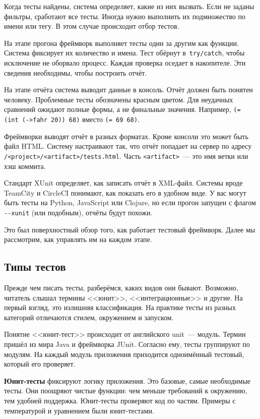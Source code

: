 Когда тесты найдены, система определяет, какие из них вызвать. Если не заданы
фильтры, сработают все тесты. Иногда нужно выполнить их подмножество по имени
или тегу. В этом случае происходит отбор тестов.

На этапе прогона фреймворк выполняет тесты один за другим как функции. Система
фиксирует их количество и имена. Тест обёрнут в~\verb|try/catch|, чтобы
исключение не оборвало процесс. Каждая проверка оседает в накопителе. Эти
сведения необходимы, чтобы построить отчёт.

На этапе отчёта система выводит данные в консоль. Отчёт должен быть понятен
человеку. Проблемные тесты обозначены красным цветом. Для неудачных сравнений
ожидают полные формы, а не финальные значения. Например,
\verb|(= (int (->fahr 20)) 68)| вместо \verb|(= 69 68)|.

Фреймворки выводят отчёт в разных форматах. Кроме консоли это может быть файл
HTML. Систему настраивают так, что отчёт попадает на сервер по адресу
\verb|/<project>/<artifact>/tests.html|. Часть \verb|<artifact>|~--- это имя
ветки или хэш коммита.

Стандарт XUnit определяет, как записать отчёт в XML-файл. Системы вроде TeamCity
и CircleCI понимают, как показать его в удобном виде. У вас могут быть тесты на
Python, JavaScript или Clojure, но если прогон запущен с флагом \verb|--xunit|
(или подобным), отчёты будут похожи.

Это был поверхностный обзор того, как работает тестовый фреймворк. Далее мы
рассмотрим, как управлять им на каждом этапе.

\subsection{Типы тестов}


Прежде чем писать тесты, разберёмся, каких видов они бывают. Возможно, читатель
слышал термины <<юнит>>, <<интеграционные>> и другие. На первый взгляд, это
излишняя классификация. На практике тесты из разных категорий отличаются стилем,
окружением и запуском.

Понятие <<юнит-тест>> происходит от английского unit~--- модуль. Термин пришёл
из мира Java и фреймворка JUnit. Согласно ему, тесты группируют по модулям. На
каждый модуль приложения приходится одноимённый тестовый, который его проверяет.

\textbf{Юнит-тесты} фиксируют логику приложения. Это базовые, самые необходимые
тесты. Они поощряют чистые функции: чем меньше требований к окружению, тем
удобней поддержка. Юнит-тесты проверяют код по частям. Примеры с температурой и
уравнением были юнит-тестами.


